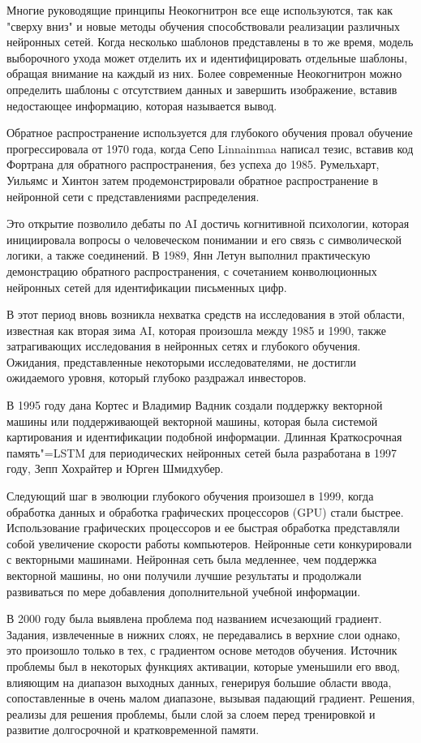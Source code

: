 Многие руководящие принципы Неокогнитрон все еще используются,
так как "сверху вниз" и новые методы обучения способствовали реализации различных нейронных сетей.
Когда несколько шаблонов представлены в то же время, модель выборочного ухода может отделить их и идентифицировать отдельные шаблоны,
обращая внимание на каждый из них. Более современные Неокогнитрон можно определить шаблоны с отсутствием данных и завершить изображение,
вставив недостающее информацию, которая называется вывод.

Обратное распространение используется для глубокого обучения провал обучение прогрессировала от 1970 года,
когда Сепо Linnainmaa написал тезис, вставив код Фортрана для обратного распространения, без успеха до 1985.
Румельхарт, Уильямс и Хинтон затем продемонстрировали обратное распространение в нейронной сети с представлениями распределения.

Это открытие позволило дебаты по AI достичь когнитивной психологии,
которая инициировала вопросы о человеческом понимании и его связь с символической логики,
а также соединений. В 1989, Янн Летун выполнил практическую демонстрацию обратного распространения,
с сочетанием конволюционных нейронных сетей для идентификации письменных цифр.

В этот период вновь возникла нехватка средств на исследования в этой области, известная как вторая зима AI,
которая произошла между 1985 и 1990, также затрагивающих исследования в нейронных сетях и глубокого обучения.
Ожидания, представленные некоторыми исследователями, не достигли ожидаемого уровня, который глубоко раздражал инвесторов.

В 1995 году дана Кортес и Владимир Вадник создали поддержку векторной машины или поддерживающей векторной машины,
которая была системой картирования и идентификации подобной информации.
Длинная Краткосрочная память"=LSTM для периодических нейронных сетей была разработана в 1997 году,
Зепп Хохрайтер и Юрген Шмидхубер.

Следующий шаг в эволюции глубокого обучения произошел в 1999,
когда обработка данных и обработка графических процессоров (GPU) стали быстрее.
Использование графических процессоров и ее быстрая обработка представляли собой увеличение скорости работы компьютеров.
Нейронные сети конкурировали с векторными машинами. Нейронная сеть была медленнее,
чем поддержка векторной машины, но они получили лучшие результаты и продолжали развиваться
по мере добавления дополнительной учебной информации.

В 2000 году была выявлена проблема под названием исчезающий градиент.
Задания, извлеченные в нижних слоях, не передавались в верхние слои однако,
это произошло только в тех, с градиентом основе методов обучения.
Источник проблемы был в некоторых функциях активации, которые уменьшили его ввод,
влияющим на диапазон выходных данных, генерируя большие области ввода,
сопоставленные в очень малом диапазоне, вызывая падающий градиент.
Решения, реализы для решения проблемы, были слой за слоем перед
тренировкой и развитие долгосрочной и кратковременной памяти.

